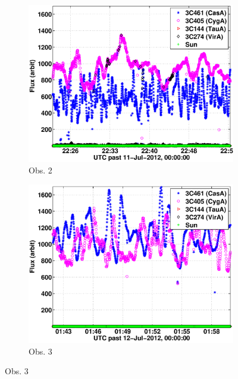 \documentclass{aa}
\begin{document}
\begin{figure}[tbh]
\begin{subfigure}[b]{\columnwidth}
\includegraphics[width=\columnwidth]{Figs/SB000_LBA_OUTER_2222-2258_1ch_1_convcalsol_bin_sigmas.eps}
\caption{Obs. 2}
\end{subfigure}

\begin{subfigure}[b]{\columnwidth}
\includegraphics[width=\columnwidth]{Figs/SB002_LBA_OUTER_SPREAD_1ch_8_convcalsol_bin_sigmas.eps}
\caption{Obs. 3}
\end{subfigure}


\end{figure}
\end{document}
